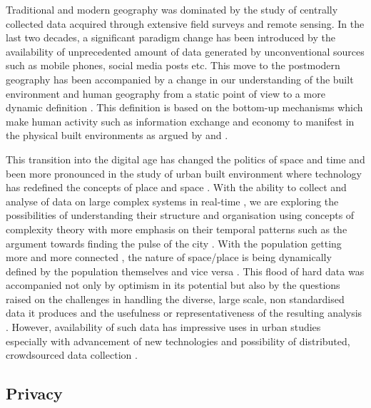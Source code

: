 Traditional and modern geography was dominated by the study of centrally collected data acquired through extensive field surveys and remote sensing.
In the last two decades, a significant paradigm change has been introduced by the availability of unprecedented amount of data generated by unconventional sources such as mobile phones, social media posts etc.
This move to the postmodern geography has been accompanied by a change in our understanding of the built environment and human geography from a static point of view to a more dynamic definition \cite{soja1989}.
This definition is based on the bottom-up mechanisms which make human activity such as information exchange and economy to manifest in the physical built environments as argued by \citep{batty1990, batty1997, batty2012} and \citep{batty2013, batty2013a}.

This transition into the digital age \citep{graham1999, tranos2012, tranos2013} has changed the politics of space and time \citep{massey1992} and been more pronounced in the study of urban built environment where technology has redefined the concepts of place and space \citep{graham2001, graham2002, sassen2001}.
With the ability to collect and analyse of data on large complex systems in real-time \citep{graham1997}, we are exploring the possibilities of understanding their structure and organisation using concepts of complexity theory \citep{bettencourt2013, portugali2012} with more emphasis on their temporal patterns such as the argument towards finding the pulse of the city \citep{batty2010}.
With the population getting more and more connected \citep{castells2010}, the nature of space/place is being dynamically defined by the population themselves \citep{giuliano1991} and vice versa \citep{zandvliet2006}.
This flood of hard data \cite{nature2008} was accompanied not only by optimism in its potential \citep{thomas2001} but also by the questions raised on the challenges in handling the diverse, large scale, non standardised data it produces and the usefulness or representativeness of the resulting analysis \citep{miller2010, arribas-bel2014a}.
However, availability of such data has impressive uses in urban studies \citep{bettencourt2014} especially with advancement of new technologies \citep{steenbruggen2013} and possibility of distributed, crowdsourced data collection \citep{lokanathan2015}.

\subsection{Privacy}

